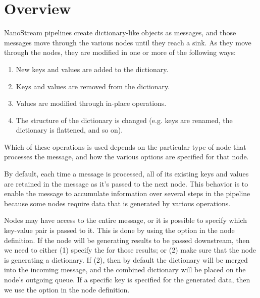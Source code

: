 \documentclass[letterpaper,10pt,english]{sphinxmanual}
\begin{document}
\section{Overview}
\label{\detokenize{data_journey:overview}}
NanoStream pipelines create dictionary-like objects as messages, and those
messages move through the various nodes until they reach a sink. As they move
through the nodes, they are modified in one or more of the following ways:
\begin{enumerate}
\def\theenumi{\arabic{enumi}}
\def\labelenumi{\theenumi .}
\makeatletter\def\p@enumii{\p@enumi \theenumi .}\makeatother
\item {} 
New keys and values are added to the dictionary.

\item {} 
Keys and values are removed from the dictionary.

\item {} 
Values are modified through in-place operations.

\item {} 
The structure of the dictionary is changed (e.g. keys are renamed, the
dictionary is flattened, and so on).

\end{enumerate}

Which of these operations is used depends on the particular type of node that
processes the message, and how the various options are specified for that
node.

By default, each time a message is processed, all of its existing keys and
values are retained in the message as it’s passed to the next node. This
behavior is to enable the message to accumulate information over several steps
in the pipeline because some nodes require data that is generated by various
operations.

Nodes may have access to the entire message, or it is possible to specify
which key-value pair is passed to it. This is done by using the 
option in the node definition. If the node will be generating results to be
passed downstream, then we need to either (1) specify the for those results; or
(2) make sure that the node is generating a dictionary. If (2), then
by default the dictionary will be merged into the incoming message, and the
combined dictionary will be placed on the node’s outgoing queue. If a specific
key is specified for the generated data, then we use the 
option in the node definition.
\end{document}
